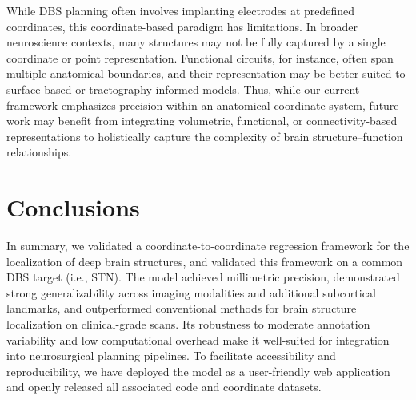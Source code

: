 While DBS planning often involves implanting electrodes at predefined coordinates, this coordinate-based paradigm has limitations. In broader neuroscience contexts, many structures may not be fully captured by a single coordinate or point representation. Functional circuits, for instance, often span multiple anatomical boundaries, and their representation may be better suited to surface-based or tractography-informed models. Thus, while our current framework emphasizes precision within an anatomical coordinate system, future work may benefit from integrating volumetric, functional, or connectivity-based representations to holistically capture the complexity of brain structure–function relationships.

\section{Conclusions}
In summary, we validated a coordinate-to-coordinate regression framework for the localization of deep brain structures, and validated this framework on a common DBS target (i.e., STN). The model achieved millimetric precision, demonstrated strong generalizability across imaging modalities and additional subcortical landmarks, and outperformed conventional methods for brain structure localization on clinical-grade scans. Its robustness to moderate annotation variability and low computational overhead make it well-suited for integration into neurosurgical planning pipelines. To facilitate accessibility and reproducibility, we have deployed the model as a user-friendly web application and openly released all associated code and coordinate datasets.

